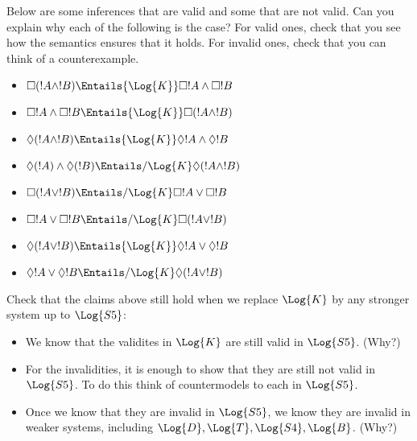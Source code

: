 \documentclass[../../../include/open-logic-section]{subfiles}
\begin{document}
\begin{prob}
    Below are some inferences that are valid and some that are not 
    valid. Can you explain why each of the following is the case? 
    For valid ones, check that you see how the semantics ensures that it holds. 
    For invalid ones, check that you can think of a counterexample.
    \begin{itemize}
        \item $\Box(!A\land!B) \Entails{\Log{K}} \Box !A \land \Box !B$
        \item $\Box !A \land \Box !B \Entails{\Log{K}} \Box(!A \land !B)$
        \item $\Diamond(!A\land!B) \Entails{\Log{K}} \Diamond !A \land \Diamond !B$
        \item $\Diamond(!A)\land\Diamond(!B) \Entails/{\Log{K}} \Diamond (!A \land !B)$
        \item $\Box(!A\lor!B) \Entails/{\Log{K}} \Box !A \lor \Box !B$
        \item $\Box !A \lor \Box !B \Entails/{\Log{K}} \Box (!A \lor !B)$
        \item $\Diamond(!A\lor!B) \Entails{\Log{K}} \Diamond !A \lor \Diamond !B$
        \item $\Diamond !A \lor \Diamond !B \Entails/{\Log{K} \Diamond(!A\lor!B)}$ 
    \end{itemize}

    Check that the claims above still hold when we replace $\Log{K}$
    by any stronger system up to $\Log{S5}$:
    \begin{itemize}
        \item We know that the validites in $\Log{K}$ are still valid 
        in $\Log{S5}$. (Why?)
        \item For the invalidities, it is enough to show that they are
        still not valid in $\Log{S5}$. To do this think of countermodels
        to each in $\Log{S5}$.
        \item Once we know that they are invalid in $\Log{S5}$, we know
        they are invalid in weaker systems, including
         $\Log{D},\Log{T},\Log{S4},\Log{B}$. (Why?)
    \end{itemize}

\end{prob}
\end{document}
